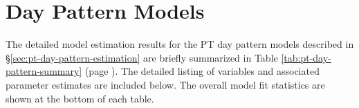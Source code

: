\chapter{Day Pattern Models}\label{app:day-pattern-models}

The detailed model estimation results for the PT day pattern models described in \S\ref{sec:pt-day-pattern-estimation} are briefly summarized in Table \ref{tab:pt-day-pattern-summary} (page \pageref{tab:pt-day-pattern-summary}). The detailed listing of variables and associated parameter estimates are included below. The overall model fit statistics are shown at the bottom of each table. 

